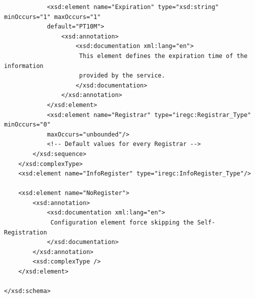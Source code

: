 \documentclass{book}
\begin{document}
\begin{verbatim}
            <xsd:element name="Expiration" type="xsd:string" minOccurs="1" maxOccurs="1" 
            default="PT10M">
                <xsd:annotation>
                    <xsd:documentation xml:lang="en">
                     This element defines the expiration time of the information
                     provided by the service.
                    </xsd:documentation>
                </xsd:annotation>
            </xsd:element>
            <xsd:element name="Registrar" type="iregc:Registrar_Type" minOccurs="0" 
            maxOccurs="unbounded"/>
            <!-- Default values for every Registrar -->
        </xsd:sequence>
    </xsd:complexType>
    <xsd:element name="InfoRegister" type="iregc:InfoRegister_Type"/>

    <xsd:element name="NoRegister">
        <xsd:annotation>
            <xsd:documentation xml:lang="en">
             Configuration element force skipping the Self-Registration
            </xsd:documentation>
        </xsd:annotation>
        <xsd:complexType />
    </xsd:element>

</xsd:schema>



\end{verbatim}

\end{document}
